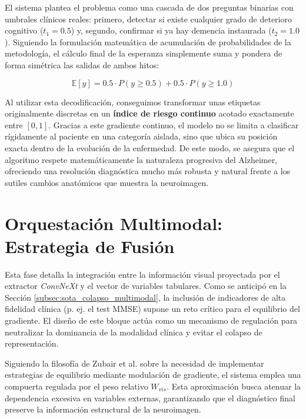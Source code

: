 \documentclass[12pt, oneside, english, spanish]{book}
\begin{document}
El sistema plantea el problema como una cascada de dos preguntas binarias con umbrales clínicos reales: primero, detectar si existe cualquier grado de deterioro cognitivo ($t_1 = 0.5$) y, segundo, confirmar si ya hay demencia instaurada ($t_2 = 1.0$). Siguiendo la formulación matemática de acumulación de probabilidades de la metodología, el cálculo final de la esperanza simplemente suma y pondera de forma simétrica las salidas de ambos hitos:

\begin{equation}
	\mathbb{E}[y] = 0.5 \cdot P(y \geq 0.5) + 0.5 \cdot P(y \geq 1.0)
\end{equation}

Al utilizar esta decodificación, conseguimos transformar unas etiquetas originalmente discretas en un \textbf{índice de riesgo continuo} acotado exactamente entre $[0, 1]$. Gracias a este gradiente continuo, el modelo no se limita a clasificar rígidamente al paciente en una categoría aislada, sino que ubica su posición exacta dentro de la evolución de la enfermedad. De este modo, se asegura que el algoritmo respete matemáticamente la naturaleza progresiva del Alzheimer, ofreciendo una resolución diagnóstica mucho más robusta y natural frente a los sutiles cambios anatómicos que muestra la neuroimagen.

\section{Orquestación Multimodal: Estrategia de Fusión} \label{sec:orquestacion_multimodal}

Esta fase detalla la integración entre la información visual proyectada por el extractor \textit{ConvNeXt} y el vector de variables tabulares. Como se anticipó en la Sección \ref{subsec:sota_colapso_multimodal}, la inclusión de indicadores de alta fidelidad clínica (p. ej. el test MMSE) supone un reto crítico para el equilibrio del gradiente. El diseño de este bloque actúa como un mecanismo de regulación para neutralizar la dominancia de la modalidad clínica y evitar el colapso de representación.

Siguiendo la filosofía de Zubair et al. \cite{qiu2023multifair} sobre la necesidad de implementar estrategias de equilibrio mediante modulación de gradiente, el sistema emplea una compuerta regulada por el peso relativo $W_{vis}$. Esta aproximación busca atenuar la dependencia excesiva en variables externas, garantizando que el diagnóstico final preserve la información estructural de la neuroimagen.
\end{document}
